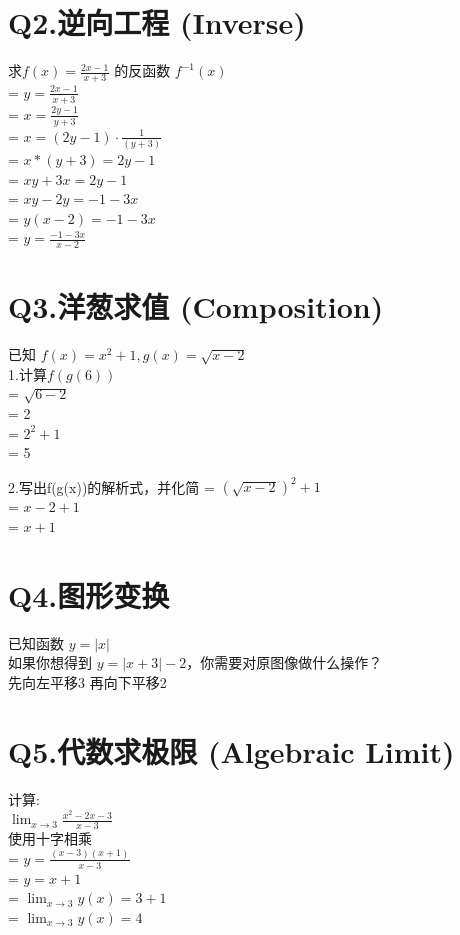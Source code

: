 \documentclass[12pt]{article}
\begin{document}
\section*{Q2.逆向工程 (Inverse)}
求$f(x) = \frac{2x-1}{x+3}$ 的反函数 $f^{-1}(x)$\\
= $y = \frac{2x-1}{x+3}$\\
= $x = \frac{2y -1}{y +3}$\\
= $x = (2y - 1) \cdot \frac{1}{(y+3)}$\\
= $x * (y +3) = 2y -1 $\\
= $xy + 3x = 2y -1$\\
= $xy - 2y = -1 - 3x$\\
= $y(x-2) =  -1 -3x$\\
= $y = \frac{-1-3x}{x-2}$\\


\section*{Q3.洋葱求值 (Composition)}
已知 $f(x) = x^{2}+1, g(x)=\sqrt{x-2}$ \\ 

1.计算$f(g(6))$\\
= $\sqrt{6-2}$\\
= 2 \\
= $2^{2} + 1$  \\
= 5

2.写出f(g(x))的解析式，并化简
= $(\sqrt{x-2}) ^2  + 1$\\
= $x-2 +1 $\\
= $x+1$\\

\section*{Q4.图形变换}
已知函数 $y = |x|$ \\ 
如果你想得到 $y = |x+3|-2 $，你需要对原图像做什么操作？\\
先向左平移3 再向下平移2\\

\section*{Q5.代数求极限 (Algebraic Limit)}
计算:\\
$\lim_{x \to 3}\frac{x^{2}-2x-3}{x-3}$ \\ 
使用十字相乘 \\ 
= $y = \frac{(x-3)(x+1)}{x-3}$ \\ 
= $y = x + 1$ \\ 
= $\lim_{x \to 3} y(x) = 3 + 1$ \\  
=  $\lim_{x \to 3} y(x) = 4$ \\ 
\end{document}
